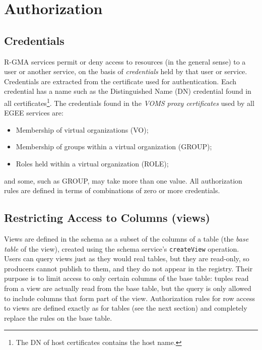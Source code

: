 \section{Authorization}
\label{sec:authorization}

\subsection{Credentials}

R-GMA services permit or deny access to resources (in the general
sense) to a user or another service, on the basis of
\textit{credentials} held by that user or service. Credentials are
extracted from the certificate used for authentication. Each
credential has a name such as the {Distinguished Name} (DN) credential
found in all certificates\footnote{The DN of host certificates
  contains the host name.}.  The credentials found in the \textit{VOMS
  proxy certificates} used by all EGEE services are:

\begin{itemize}
\item Membership of virtual organizations (VO);
\item Membership of groups within a virtual organization (GROUP);
\item Roles held within a virtual organization (ROLE);
\end{itemize}

and some, such as GROUP, may take more than one value.  All
authorization rules are defined in terms of combinations of zero or
more credentials.

\subsection{Restricting Access to Columns (views)}
\label{sec:SecurityViews}

Views are defined in the schema as a subset of the columns of a table
(the \textit{base table} of the view), created using the schema
service's \texttt{createView} operation. Users can query views just as
they would real tables, but they are read-only, so producers cannot
publish to them, and they do not appear in the registry. Their purpose
is to limit access to only certain columns of the base table: tuples
read from a view are actually read from the base table, but the query
is only allowed to include columns that form part of the
view. Authorization rules for row access to views are defined exactly
as for tables (see the next section) and completely replace the rules
on the base table.

